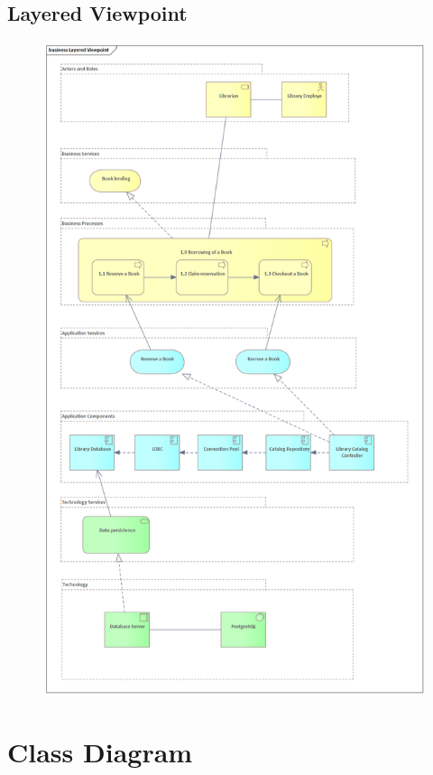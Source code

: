 \documentclass[11pt,twoside,a4paper]{article}
\begin{document}
\subsection{Layered Viewpoint}
\begin{figure}[!ht]
    \includegraphics[scale=.5]{../ea/Layered Viewpoint.png}
    \centering
\end{figure}

\section{Class Diagram}
\end{document}

